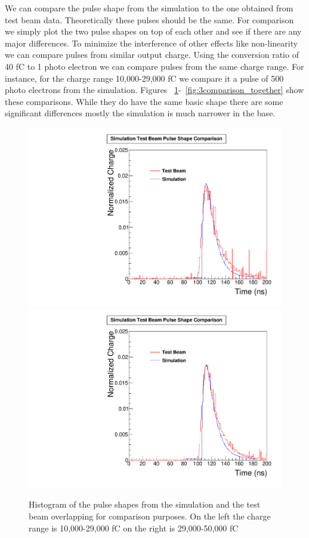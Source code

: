 We can compare the pulse shape from the simulation to the one obtained from test beam data. Theoretically these pulses should be the same. For comparison we simply plot the two pulse shapes on top of each other and see if there are any major differences. To minimize the interference of other effects like non-linearity we can compare pulses from similar output charge. Using the conversion ratio of 40 fC to 1 photo electron we can compare pulses from the same charge range. For instance, for the charge range 10,000-29,000 fC we compare it a pulse of 500 photo electrons from the simulation. Figures ~\ref{fig:1comparison_together}-~\ref{fig:3comparison_together} show these comparisons. While they do have the same basic shape there are some significant differences mostly the simulation is much narrower in the base.

\begin{figure}
\centering
\includegraphics[width=0.495\linewidth]{Figures/10Comparison.pdf}
\includegraphics[width=0.495\linewidth]{Figures/29Comparison.pdf}
\caption{Histogram of the pulse shapes from the simulation and the test beam overlapping for comparison purposes. On the left the charge range is 10,000-29,000 fC on the right is 29,000-50,000 fC}
\label{fig:1comparison_together}
\end{figure}

